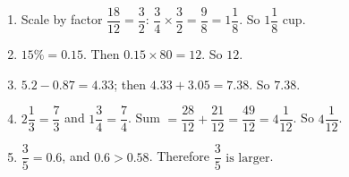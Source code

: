 \documentclass[11pt]{article}
\begin{document}
\begin{enumerate}
  \item Scale by factor $\dfrac{18}{12}=\dfrac{3}{2}$: $\dfrac{3}{4}\times\dfrac{3}{2}=\dfrac{9}{8}=1\dfrac{1}{8}$. So $\boxed{1\dfrac{1}{8}\text{ cup}}$.
  \item $15\% = 0.15$. Then $0.15\times80=12$. So $\boxed{12}$.
  \item $5.2-0.87=4.33$; then $4.33+3.05=7.38$. So $\boxed{7.38}$.
  \item $2\dfrac{1}{3}=\dfrac{7}{3}$ and $1\dfrac{3}{4}=\dfrac{7}{4}$. Sum $=\dfrac{28}{12}+\dfrac{21}{12}=\dfrac{49}{12}=4\dfrac{1}{12}$. So $\boxed{4\dfrac{1}{12}}$.
  \item $\dfrac{3}{5}=0.6$, and $0.6>0.58$. Therefore $\boxed{\dfrac{3}{5}\text{ is larger}}$.
\end{enumerate}
\end{document}
